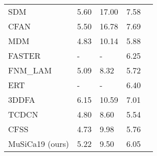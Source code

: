 \documentclass[9pt,twocolumn]{extarticle}
\begin{document}
\begin{table}[H]
{\begin{tabular}{@{}llllll@{}}
\multicolumn{2}{l}{SDM \cite{xiong2013supervised}}                      & 5.60                                 & 17.00                                & 7.58                                 & \cellcolor[HTML]{0000FF}{\color[HTML]{000000} } \\
\multicolumn{2}{l}{CFAN \cite{zhang2014coarse}}                     & 5.50                                 & 16.78                                & 7.69                                 & \cellcolor[HTML]{0000FF}                        \\
\multicolumn{2}{l}{MDM \cite{trigeorgis2016mnemonic}}                      & 4.83                                 & 10.14                                & 5.88                                 & \cellcolor[HTML]{0000FF}                        \\
\multicolumn{2}{l}{FASTER \cite{duan2019faster}}                   & -                                    & -                                    & 6.25                                 & \cellcolor[HTML]{0000FF}                        \\
\multicolumn{2}{l}{FNM\_LAM \cite{liu2019efficient}}                 & 5.09                                 & 8.32                                 & 5.72                                 & \cellcolor[HTML]{0000FF}                        \\
\multicolumn{2}{l}{ERT \cite{kazemi2014one}}                      & -                                    & -                                    & 6.40                                 & \cellcolor[HTML]{0000FF}                        \\
\multicolumn{2}{l}{3DDFA \cite{zhu2016face}}                    & 6.15                                 & 10.59                                & 7.01                                 & \cellcolor[HTML]{0000FF}                        \\
\multicolumn{2}{l}{TCDCN \cite{zhang2014facial}}                    & 4.80                                 & 8.60                                 & 5.54                                 & \cellcolor[HTML]{0000FF}                        \\
\multicolumn{2}{l}{CFSS \cite{zhu2015face}}                     & 4.73                                 & 9.98                                 & 5.76                                 & \cellcolor[HTML]{0000FF} \\
\multicolumn{2}{l}{MuSiCa19 (ours)}                     & 5.22                                 & 9.50                                 & 6.05                                 & \cellcolor[HTML]{0000FF} \\

\end{tabular}}
\end{table}
\end{document}
